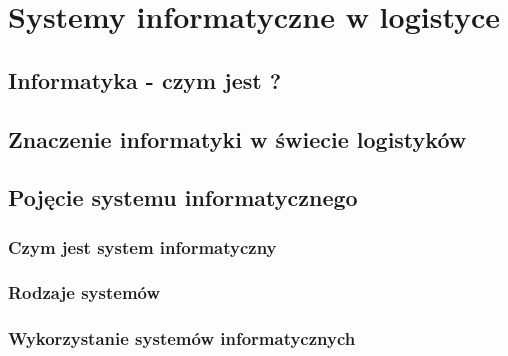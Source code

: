 \chapter{Systemy informatyczne w logistyce}
\label{c3:c3}

\section{Informatyka - czym jest ?}
\section{Znaczenie informatyki w świecie logistyków}
\section{Pojęcie systemu informatycznego}
	\subsection{Czym jest system informatyczny}
	\subsection{Rodzaje systemów}
	\subsection{Wykorzystanie systemów informatycznych}